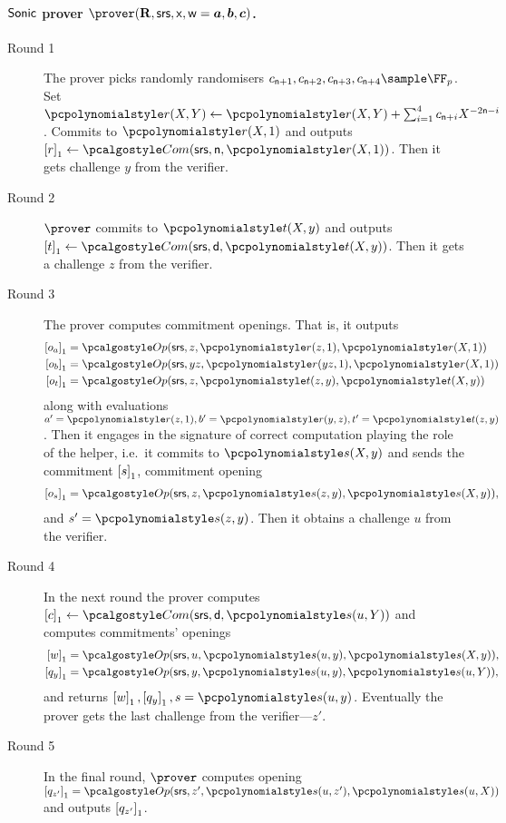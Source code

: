 \documentclass[runningheads,11pt]{llncs}
\begin{document}
\paragraph{${\textnormal{\textsf{Sonic}}}$ prover $\prover(\REL, \srs, \inp, \wit=\va, \vb, \vc)$.}
\begin{description}
\item[Round 1] The prover picks randomly randomisers
  $c_{\multconstr + 1}, c_{\multconstr + 2}, c_{\multconstr + 3}, c_{\multconstr
    + 4} \sample \FF_p$. Set
  $\pr(X, Y) \gets \pr(X, Y) + \sum_{i = 1}^4 c_{\multconstr + i} X^{- 2
    \multconstr - i}$. Commits to $\pr(X, 1)$ and outputs
  $\gone{r} \gets \com(\srs, \multconstr, \pr(X, 1))$.  Then it gets challenge $y$ from
  the verifier.
\item[Round 2] $\prover$ commits to $\pt(X, y)$ and outputs
  $\gone{t} \gets \com(\srs, \dconst, \pt(X, y))$. Then it gets a challenge $z$ from
  the verifier.
\item[Round 3] The prover computes commitment openings. That is, it outputs
  \begin{align*}
    \gone{o_a} & = \open(\srs, z, \pr(z, 1), \pr(X, 1)) \\
    \gone{o_b} & = \open(\srs, yz, \pr(yz, 1), \pr(X, 1)) \\
    \gone{o_t} & = \open(\srs, z, \pt(z, y), \pt(X, y)) 
  \end{align*}
  along with evaluations $a' = \pr(z, 1), b' = \pr(y, z), t' = \pt(z, y)$.  Then it
  engages in the signature of correct computation playing the role of the
  helper, i.e.~it commits to $\p{s}(X, y)$ and sends the commitment $\left[s\right]_{1}$, commitment opening
  \begin{align*}
    \gone{o_s} & = \open(\srs, z, \p{s}(z, y), \p{s}(X, y)), \\
  \end{align*} and $s'=\p{s}(z, y)$. 
%
  Then
  it obtains a challenge $u$ from the verifier.
\item[Round 4] In the next round the prover computes
  $\gone{c} \gets \com(\srs, \dconst, \p{s}(u, Y))$ and
  computes commitments' openings
  \begin{align*}
    \gone{w} & = \open(\srs, u, \p{s}(u, y), \p{s}(X, y)), \\
    \gone{q_y} & = \open(\srs, y,\p{s}(u, y), \p{s}(u, Y)),
  \end{align*}
  and returns $\gone{w}, \gone{q_y}, s = \p{s}(u, y)$. Eventually the prover gets the last challenge
  from the verifier---$z'$.
\item[Round 5] In the final round, $\prover$ computes opening
  $\gone{q_{z'}} = \open(\srs, z', \p{s}(u, z'), \p{s}(u, X))$ and outputs $\left[q_{z'}\right]_{1}$.
\end{description}
\end{document}
